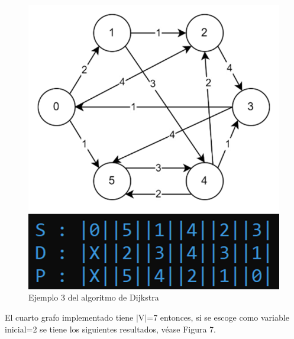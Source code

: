 \documentclass[12pt,twoside]{article}
\begin{document}
    \begin{figure}[H]
        \centering
        \includegraphics{imagenes/Imagen3.png}
        \caption{Ejemplo 3 del algoritmo de Dijkstra}
    \end{figure}
    El cuarto grafo implementado tiene $|$V$|$=7 entonces, si se escoge como variable inicial=2 se tiene los siguientes resultados, v\'ease Figura 7.
\end{document}
